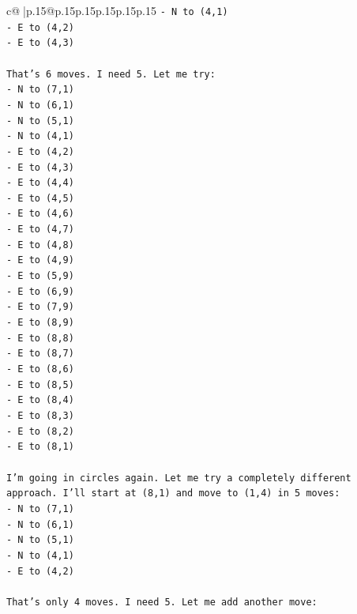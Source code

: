 \documentclass{article}
\begin{document}
{\begin{supertabular}{c@{$\;$}|p{.15\linewidth}@{}p{.15\linewidth}p{.15\linewidth}p{.15\linewidth}p{.15\linewidth}p{.15\linewidth}}
{{{\texttt{{-} N to (4,1)} \\
\texttt{{-} E to (4,2)} \\
\texttt{{-} E to (4,3)} \\
\\ 
\texttt{That's 6 moves. I need 5. Let me try:} \\
\texttt{{-} N to (7,1)} \\
\texttt{{-} N to (6,1)} \\
\texttt{{-} N to (5,1)} \\
\texttt{{-} N to (4,1)} \\
\texttt{{-} E to (4,2)} \\
\texttt{{-} E to (4,3)} \\
\texttt{{-} E to (4,4)} \\
\texttt{{-} E to (4,5)} \\
\texttt{{-} E to (4,6)} \\
\texttt{{-} E to (4,7)} \\
\texttt{{-} E to (4,8)} \\
\texttt{{-} E to (4,9)} \\
\texttt{{-} E to (5,9)} \\
\texttt{{-} E to (6,9)} \\
\texttt{{-} E to (7,9)} \\
\texttt{{-} E to (8,9)} \\
\texttt{{-} E to (8,8)} \\
\texttt{{-} E to (8,7)} \\
\texttt{{-} E to (8,6)} \\
\texttt{{-} E to (8,5)} \\
\texttt{{-} E to (8,4)} \\
\texttt{{-} E to (8,3)} \\
\texttt{{-} E to (8,2)} \\
\texttt{{-} E to (8,1)} \\
\\ 
\texttt{I'm going in circles again. Let me try a completely different approach. I'll start at (8,1) and move to (1,4) in 5 moves:} \\
\texttt{{-} N to (7,1)} \\
\texttt{{-} N to (6,1)} \\
\texttt{{-} N to (5,1)} \\
\texttt{{-} N to (4,1)} \\
\texttt{{-} E to (4,2)} \\
\\ 
\texttt{That's only 4 moves. I need 5. Let me add another move:} \\
}}}
\end{supertabular}}
\end{document}
